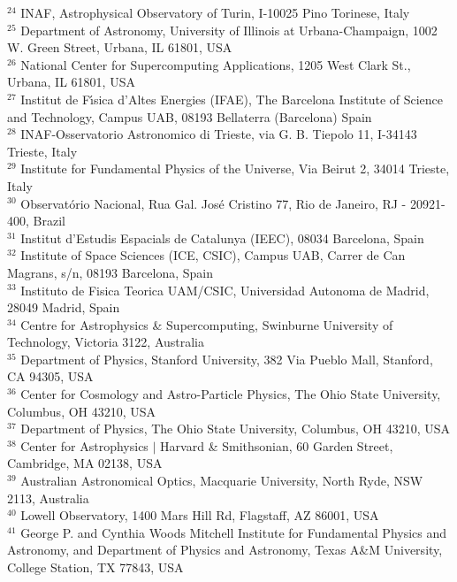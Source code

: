 {{$^{24}$ INAF, Astrophysical Observatory of Turin, I-10025 Pino Torinese, Italy\\
$^{25}$ Department of Astronomy, University of Illinois at Urbana-Champaign, 1002 W. Green Street, Urbana, IL 61801, USA\\
$^{26}$ National Center for Supercomputing Applications, 1205 West Clark St., Urbana, IL 61801, USA\\
$^{27}$ Institut de F\'{\i}sica d'Altes Energies (IFAE), The Barcelona Institute of Science and Technology, Campus UAB, 08193 Bellaterra (Barcelona) Spain\\
$^{28}$ INAF-Osservatorio Astronomico di Trieste, via G. B. Tiepolo 11, I-34143 Trieste, Italy\\
$^{29}$ Institute for Fundamental Physics of the Universe, Via Beirut 2, 34014 Trieste, Italy\\
$^{30}$ Observat\'orio Nacional, Rua Gal. Jos\'e Cristino 77, Rio de Janeiro, RJ - 20921-400, Brazil\\
$^{31}$ Institut d'Estudis Espacials de Catalunya (IEEC), 08034 Barcelona, Spain\\
$^{32}$ Institute of Space Sciences (ICE, CSIC),  Campus UAB, Carrer de Can Magrans, s/n,  08193 Barcelona, Spain\\
$^{33}$ Instituto de Fisica Teorica UAM/CSIC, Universidad Autonoma de Madrid, 28049 Madrid, Spain\\
$^{34}$ Centre for Astrophysics \& Supercomputing, Swinburne University of Technology, Victoria 3122, Australia\\
$^{35}$ Department of Physics, Stanford University, 382 Via Pueblo Mall, Stanford, CA 94305, USA\\
$^{36}$ Center for Cosmology and Astro-Particle Physics, The Ohio State University, Columbus, OH 43210, USA\\
$^{37}$ Department of Physics, The Ohio State University, Columbus, OH 43210, USA\\
$^{38}$ Center for Astrophysics $\vert$ Harvard \& Smithsonian, 60 Garden Street, Cambridge, MA 02138, USA\\
$^{39}$ Australian Astronomical Optics, Macquarie University, North Ryde, NSW 2113, Australia\\
$^{40}$ Lowell Observatory, 1400 Mars Hill Rd, Flagstaff, AZ 86001, USA\\
$^{41}$ George P. and Cynthia Woods Mitchell Institute for Fundamental Physics and Astronomy, and Department of Physics and Astronomy, Texas A\&M University, College Station, TX 77843,  USA\\
}}

